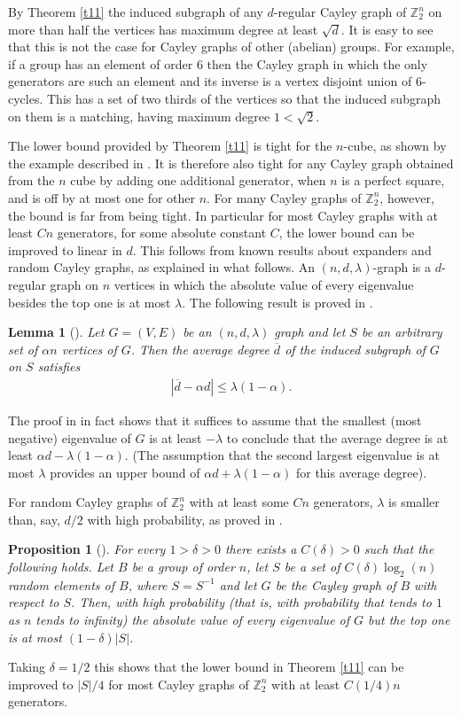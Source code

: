 \documentclass[11pt]{article}
\newtheorem{prop}[theo]{Proposition}
\newtheorem{lemma}[theo]{Lemma}
\begin{document}
By Theorem \ref{t11} the induced subgraph of any $d$-regular Cayley graph of ${\mathbb{Z}_{2}^{n}}$ on more than half the vertices has maximum 
degree at least $\sqrt d$. It is easy to see that this is not the case 
for Cayley graphs of other (abelian) groups. For example, 
if a group has an element of order $6$ then the Cayley graph in which the
only generators are such an element and its inverse is a vertex disjoint
union of $6$-cycles. This has a set of two thirds of the vertices so that
the induced subgraph on them is a matching, having maximum degree $1<
\sqrt 2$. 

The lower bound provided by Theorem \ref{t11} is  
tight for the $n$-cube,
as shown by the example described in 
\cite{CFGS}. It is therefore also tight for any Cayley graph obtained
from the $n$ cube by adding one additional generator, when $n$ is a perfect square, and is off by at most one for other $n$. For many Cayley
graphs of ${\mathbb{Z}_{2}^{n}}$, however, the bound is far from being tight. 
In particular for most Cayley graphs with at least $Cn$ generators,
for some absolute constant $C$, the lower bound can be
improved to linear in $d$. This follows from known
results about expanders and random Cayley graphs, as explained in
what follows.
An $(n,d,\lambda)$-graph is 
a $d$-regular graph on $n$ vertices in which the absolute value
of every eigenvalue besides the top one is at most $\lambda$.
The following result is proved in \cite{AC}. 
\begin{lemma}[\cite{AC}]
\label{AC}
Let $G = (V, E)$ be an $(n, d, \lambda)$ graph and let
$S$ be an arbitrary set of $\alpha n$ vertices of $G$. Then the average
degree $\overline{d}$ of the induced subgraph of $G$ on $S$ satisfies
\begin{align*}
    |\overline{d} - \alpha d| \leq \lambda (1-\alpha).
\end{align*}
\end{lemma}
The proof in \cite{AC} in fact  shows that it suffices 
to assume that the smallest (most negative) eigenvalue of
$G$ is at least $-\lambda$ to conclude that the average degree
is at least $\alpha d - \lambda (1-\alpha)$. (The assumption that
the second largest eigenvalue is at most $\lambda$ provides an
upper bound of $\alpha d + \lambda (1-\alpha)$ for this average degree).

For random Cayley graphs 
of ${\mathbb{Z}_{2}^{n}}$ with at least some $Cn$ generators,
$\lambda$ is smaller than, say, $d/2$ with high probability, as
proved in \cite{AR}. 
\begin{prop}[\cite{AR}]
\label{p41}
For every $1 > \delta > 0$ there exists a 
$C(\delta) > 0$ such that the following holds. Let $B$ be a 
group of order $n$, let $S$ be a set of $C(\delta)\log_2(n)$ 
random elements of $B$, where $S=S^{-1}$ and let 
$G$ be the Cayley graph of $B$ 
with respect to $S$. Then, with high probability (that is, with probability
that tends to $1$ as $n$ tends to infinity) the absolute value of
every eigenvalue of $G$ but the top one is at
most $(1-\delta)|S|$.
\end{prop}
Taking $\delta=1/2$ this shows that the lower bound in
Theorem \ref{t11} can be improved to $|S|/4$ for most 
Cayley graphs  of ${\mathbb{Z}_{2}^{n}}$ with at least $C(1/4)n$ generators.
\end{document}
